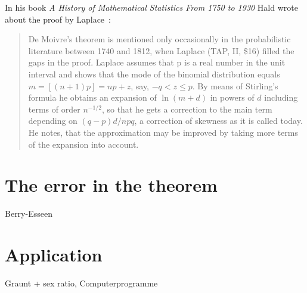 In his book \emph{A History of Mathematical Statistics From 1750 to 1930} Hald wrote about the proof by Laplace~\cite[p. 24]{hald2}:

\begin{quotation}
  De Moivre's theorem is mentioned only occasionally in the probabilistic literature between 1740 and 1812, when Laplace (TAP, II, \$16)  filled the gaps in the proof. Laplace assumes that p is a real number in the unit interval  and shows that the mode of the binomial distribution equals $m=[(n+1)p]=np+z$, say, $-q < z \le p$. By means of Stirling's formula he obtains an expansion of $\ln(m+d)$ in powers of $d$ including terms of order $n^{-1/2}$, so that he gets a correction to the main term depending on $(q-p)d/npq$, a correction of skewness as it is called today. He notes, that the approximation may be improved by taking more terms of the expansion into account.
\end{quotation}

\section{The error in the theorem}

Berry-Esseen

\section{Application}

Graunt + sex ratio, Computerprogramme
